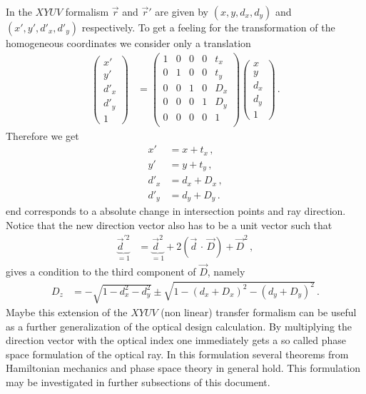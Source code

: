 \documentclass[12pt,a4paper,twoside,openright,BCOR10mm,headsepline,titlepage,abstracton,chapterprefix,final]{scrreprt}
\newcommand{\scpm}[2]{(#1\,\cdot\,#2)}
\begin{document}
In the $XYUV$ formalism $\vec{r}$ and $\vec{r}'$ are given by $(x,y,d_x,d_y)$ and $(x',y',{d'}_x,{d'}_y)$
respectively. To get a feeling for the transformation of the homogeneous coordinates we consider only
a translation
\begin{align}
 \begin{pmatrix} x' \\ y' \\ {d'}_x \\ {d'}_y \\ 1 \end{pmatrix} &=
 \begin{pmatrix} 1 & 0 & 0 & 0 & t_x \\
                 0 & 1 & 0 & 0 & t_y \\
                 0 & 0 & 1 & 0 & D_x \\
                 0 & 0 & 0 & 1 & D_y \\
                 0 & 0 & 0 & 0 & 1 \\
 \end{pmatrix}
 \begin{pmatrix} x \\ y \\ d_x \\ d_y \\ 1 \end{pmatrix}\,.
\end{align}
Therefore we get
\begin{subequations}
\begin{align}
 x' &= x + t_x\,,\\
 y' &= y + t_y\,,\\
 {d'}_x &= d_x + D_x\,,\\
 {d'}_y &= d_y + D_y\,.
\end{align}
\end{subequations}
end corresponds to a absolute change in intersection points and ray direction.
Notice that the new direction vector also has to be a unit vector such that
\begin{align}
 \underbrace{{\vec{d}}^{\prime 2}}_{=1} &= \underbrace{\vec{d}^2}_{=1} + 2 \scpm{\vec{d}}{\vec{D}} + \vec{D}^2\,,
\end{align}
gives a condition to the third component of $\vec{D}$, namely
\begin{align}
 D_z &= -\sqrt{1 - d_x^2 - d_y^2} \pm \sqrt{1 - (d_x + D_x)^2 - (d_y + D_y)^2}\,.
\end{align}
Maybe this extension of the $XYUV$ (non linear) transfer formalism can be useful as a further generalization of
the optical design calculation. By multiplying the direction vector with the optical index one immediately gets
a so called phase space formulation of the optical ray. In this formulation several theorems from Hamiltonian
mechanics and phase space theory in general hold. This formulation may be investigated in further subsections of this document.
\end{document}
